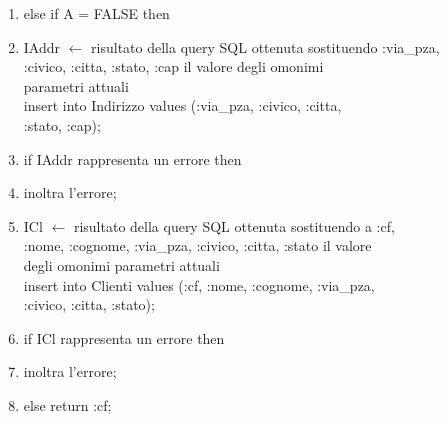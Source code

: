\documentclass[a4paper,12pt]{report}
\begin{document}
{\begin{enumerate}[label*=\arabic*]
            \item \hspace*{1cm} else if A = FALSE then
            \item \hspace*{2cm} IAddr $\leftarrow$ risultato della query SQL ottenuta sostituendo :via\_pza, \\
              \hspace*{3cm} :civico, :citta, :stato, :cap il valore degli omonimi \\
              \hspace*{3cm} parametri attuali \\
              \hspace*{3cm} insert into Indirizzo values (:via\_pza, :civico, :citta, \\
              \hspace*{4cm} :stato, :cap);
            \item \hspace*{2cm} if IAddr rappresenta un errore then
            \item \hspace*{3cm} inoltra l'errore;
            \item \hspace*{1cm} ICl $\leftarrow$ risultato della query SQL ottenuta sostituendo a :cf, \\
              \hspace*{2cm} :nome, :cognome, :via\_pza, :civico, :citta, :stato il valore \\
              \hspace*{2cm} degli omonimi parametri attuali \\
              \hspace*{2cm} insert into Clienti values (:cf, :nome, :cognome, :via\_pza, \\
              \hspace*{3cm} :civico, :citta, :stato);
            \item \hspace*{1cm} if ICl rappresenta un errore then
            \item \hspace*{2cm} inoltra l'errore;
            \item \hspace*{1cm} else return :cf;
          \end{enumerate}
        }
\end{document}
